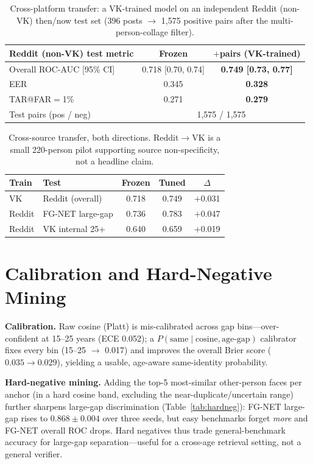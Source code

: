 \documentclass[letterpaper]{article} %
\begin{document}
\begin{table}[t]
\centering
\small
\begin{tabular}{@{}lcc@{}}
\toprule
Reddit (non-VK) test metric & Frozen & $+$pairs (VK-trained) \\
\midrule
Overall ROC-AUC [95\% CI] & 0.718 [0.70, 0.74] & \textbf{0.749 [0.73, 0.77]} \\
EER & 0.345 & \textbf{0.328} \\
TAR@FAR$=$1\% & 0.271 & \textbf{0.279} \\
\midrule
Test pairs (pos / neg) & \multicolumn{2}{c}{1{,}575 / 1{,}575} \\
\bottomrule
\end{tabular}
\caption{Cross-platform transfer: a VK-trained model on an independent Reddit (non-VK) then/now test set (396 posts $\rightarrow$ 1{,}575 positive pairs after the multi-person-collage filter).}
\label{tab:crossplatform}
\end{table}

\begin{table}[t]
\centering
\small
\begin{tabular}{@{}llccc@{}}
\toprule
Train & Test & Frozen & Tuned & $\Delta$ \\
\midrule
VK & Reddit (overall) & 0.718 & 0.749 & $+$0.031 \\
Reddit & FG-NET large-gap & 0.736 & 0.783 & $+$0.047 \\
Reddit & VK internal 25+ & 0.640 & 0.659 & $+$0.019 \\
\bottomrule
\end{tabular}
\caption{Cross-source transfer, both directions. Reddit$\to$VK is a small 220-person pilot supporting source non-specificity, not a headline claim.}
\label{tab:crosssource}
\end{table}

\section{Calibration and Hard-Negative Mining}\label{sup:calib}
\textbf{Calibration.} Raw cosine (Platt) is mis-calibrated across gap bins---over-confident at 15--25 years (ECE 0.052); a $P(\text{same}\mid\text{cosine},\text{age-gap})$ calibrator fixes every bin (15--25 $\rightarrow$ 0.017) and improves the overall Brier score ($0.035\!\rightarrow\!0.029$), yielding a usable, age-aware same-identity probability.

\textbf{Hard-negative mining.} Adding the top-5 most-similar other-person faces per anchor (in a hard cosine band, excluding the near-duplicate/uncertain range) further sharpens large-gap discrimination (Table~\ref{tab:hardneg}): FG-NET large-gap rises to $0.868\pm0.004$ over three seeds, but easy benchmarks forget \emph{more} and FG-NET overall ROC drops. Hard negatives thus trade general-benchmark accuracy for large-gap separation---useful for a cross-age retrieval setting, not a general verifier.
\end{document}
